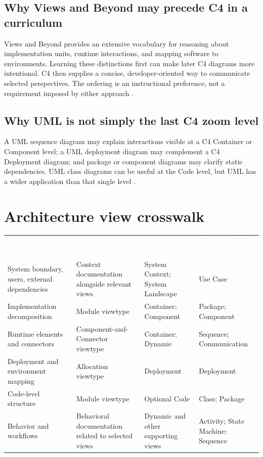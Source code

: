\documentclass[11pt,letterpaper,oneside]{article}
\newcommand{\thead}[1]{\textcolor{white}{\bfseries #1}}
\begin{document}
\subsection{Why Views and Beyond may precede C4 in a curriculum}
Views and Beyond provides an extensive vocabulary for reasoning about implementation units, runtime interactions, and mapping software to environments. Learning these distinctions first can make later C4 diagrams more intentional. C4 then supplies a concise, developer-oriented way to communicate selected perspectives. The ordering is an instructional preference, not a requirement imposed by either approach \cite{viewsbeyond,c4home}.

\subsection{Why UML is not simply the last C4 zoom level}
A UML sequence diagram may explain interactions visible at a C4 Container or Component level; a UML deployment diagram may complement a C4 Deployment diagram; and package or component diagrams may clarify static dependencies. UML class diagrams can be useful at the Code level, but UML has a wider application than that single level \cite{uml,c4intro}.

\section{Architecture view crosswalk}\label{sec:crosswalk}
\small
\begin{tabularx}{\textwidth}{@{}L{0.18\textwidth}L{0.24\textwidth}L{0.24\textwidth}Y@{}}
\thead{Concern} & \thead{Views and Beyond} & \thead{C4 view} & \thead{Potential UML notation}\\
System boundary, users, external dependencies & Context documentation alongside relevant views & System Context; System Landscape & Use Case\\
Implementation decomposition & Module viewtype & Container; Component & Package; Component\\
Runtime elements and connectors & Component-and-Connector viewtype & Container; Dynamic & Sequence; Communication\\
Deployment and environment mapping & Allocation viewtype & Deployment & Deployment\\
Code-level structure & Module viewtype & Optional Code & Class; Package\\
Behavior and workflows & Behavioral documentation related to selected views & Dynamic and other supporting views & Activity; State Machine; Sequence\\
\end{tabularx}
\normalsize
\end{document}
